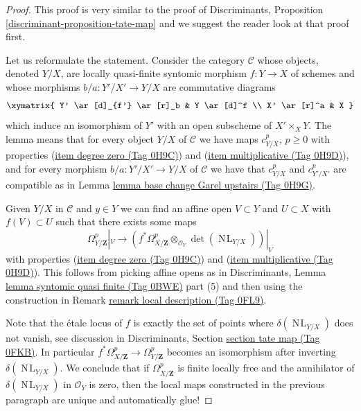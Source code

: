 \documentclass{amsart}
\theoremstyle{plain}
\theoremstyle{definition}
\theoremstyle{remark}
\numberwithin{equation}{subsection}
\def\NL{\mathop{N\!L}\nolimits}
\begin{document}
\begin{proof}
This proof is very similar to the proof of
Discriminants, Proposition \ref{discriminant-proposition-tate-map}
and we suggest the reader look at that proof first.

\medskip\noindent
Let us reformulate the statement. Consider the category
$\mathcal{C}$ whose objects, denoted $Y/X$, are locally quasi-finite syntomic
morphism $f : Y \to X$ of schemes and whose morphisms
$b/a : Y'/X' \to Y/X$ are commutative diagrams
$$
\xymatrix{
Y' \ar[d]_{f'} \ar[r]_b & Y \ar[d]^f \\
X' \ar[r]^a & X
}
$$
which induce an isomorphism of $Y'$ with an open subscheme of
$X' \times_X Y$. The lemma means that for every object
$Y/X$ of $\mathcal{C}$ we have maps $c^p_{Y/X}$, $p \geq 0$
with properties (\href{https://stacks.math.columbia.edu/tag/0H9C}{item degree zero (Tag 0H9C)}) and (\href{https://stacks.math.columbia.edu/tag/0H9D}{item multiplicative (Tag 0H9D)}),
and for every morphism $b/a : Y'/X' \to Y/X$ of $\mathcal{C}$ we have
that $c^p_{Y/X}$ and $c^p_{Y'/X'}$ are compatible as in
Lemma \href{https://stacks.math.columbia.edu/tag/0H9G}{lemma base change Garel upstairs (Tag 0H9G)}.

\medskip\noindent
Given $Y/X$ in $\mathcal{C}$ and $y \in Y$ we can find
an affine open $V \subset Y$ and $U \subset X$ with $f(V) \subset U$
such that there exists some maps
$$
\Omega^p_{Y/\mathbf{Z}}|_V
\longrightarrow
\left(
f^*\Omega^p_{X/\mathbf{Z}} \otimes_{\mathcal{O}_Y} \det(\NL_{Y/X})
\right)|_V
$$
with properties (\href{https://stacks.math.columbia.edu/tag/0H9C}{item degree zero (Tag 0H9C)}) and (\href{https://stacks.math.columbia.edu/tag/0H9D}{item multiplicative (Tag 0H9D)}).
This follows from picking affine opens as in
Discriminants, Lemma \href{https://stacks.math.columbia.edu/tag/0BWE}{lemma syntomic quasi finite (Tag 0BWE)} part (5)
and then using the construction in Remark \href{https://stacks.math.columbia.edu/tag/0FL9}{remark local description (Tag 0FL9)}.

\medskip\noindent
Note that the \'etale locus of $f$ is exactly the set of points where
$\delta(\NL_{Y/X})$ does not vanish, see discussion in
Discriminants, Section \href{https://stacks.math.columbia.edu/tag/0FKB}{section tate map (Tag 0FKB)}.
In particular
$f^*\Omega^p_{X/\mathbf{Z}} \to \Omega^p_{Y/\mathbf{Z}}$
becomes an isomorphism after inverting $\delta(\NL_{Y/X})$.
We conclude that if $\Omega^p_{X/\mathbf{Z}}$ is finite locally free and
the annihilator of $\delta(\NL_{Y/X})$ in $\mathcal{O}_Y$ is zero, then
the local maps constructed in the previous paragraph
are unique and automatically glue!


\end{proof}
\end{document}
